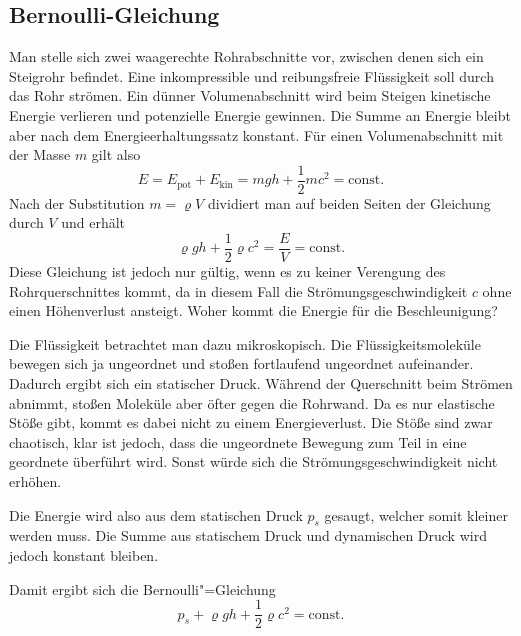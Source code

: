 \documentclass[a4paper,10pt,fleqn,twocolumn,twoside]{scrartcl}
\begin{document}
\subsection{Bernoulli-Gleichung}

Man stelle sich zwei waagerechte Rohrabschnitte vor, zwischen denen
sich ein Steigrohr befindet. Eine inkompressible und reibungsfreie
Flüssigkeit soll durch das Rohr strömen. Ein dünner Volumenabschnitt
wird beim Steigen kinetische Energie verlieren und potenzielle Energie
gewinnen. Die Summe an Energie bleibt aber nach dem Energieerhaltungssatz
konstant. Für einen Volumenabschnitt mit der Masse $m$ gilt also%
\[E=E_\mathrm{pot}+E_\mathrm{kin}
=mgh+\frac{1}{2}mc^2=\mathrm{const}.\]
Nach der Substitution $m=\varrho V$ dividiert
man auf beiden Seiten der Gleichung durch $V$ und erhält%
\[\varrho gh+\frac{1}{2}\varrho c^2=\frac{E}{V}=\mathrm{const}.\]
Diese Gleichung ist jedoch nur gültig, wenn es zu keiner
Verengung des Rohrquerschnittes kommt, da in diesem Fall die
Strömungsgeschwindigkeit $c$ ohne einen Höhenverlust ansteigt.
Woher kommt die Energie für die Beschleunigung?

Die Flüssigkeit betrachtet man dazu mikroskopisch.
Die Flüssigkeitsmoleküle bewegen sich ja ungeordnet und stoßen
fortlaufend ungeordnet aufeinander. Dadurch ergibt sich ein
statischer Druck. Während der Querschnitt beim Strömen abnimmt,
stoßen Moleküle aber öfter gegen die Rohrwand. Da es nur
elastische Stöße gibt, kommt es dabei nicht zu einem Energieverlust.
Die Stöße sind zwar chaotisch, klar ist jedoch, dass die ungeordnete
Bewegung zum Teil in eine geordnete überführt wird. Sonst würde
sich die Strömungsgeschwindigkeit nicht erhöhen.

Die Energie wird also aus dem statischen Druck $p_s$ gesaugt,
welcher somit kleiner werden muss. Die Summe aus statischem
Druck und dynamischen Druck wird jedoch konstant bleiben.

Damit ergibt sich die Bernoulli"=Gleichung%
\[p_s+\varrho gh+\frac{1}{2}\varrho c^2 = \mathrm{const}.\]
\end{document}
